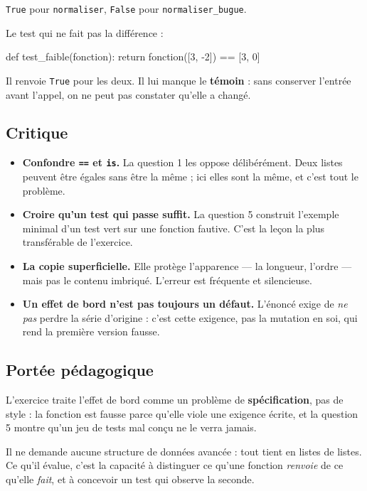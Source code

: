 \lstinline{True} pour \lstinline{normaliser}, \lstinline{False} pour
\lstinline{normaliser_bugue}.

Le test qui ne fait pas la différence :

\begin{python}
def test_faible(fonction):
    return fonction([3, -2]) == [3, 0]
\end{python}

Il renvoie \lstinline{True} pour les deux. Il lui manque le \textbf{témoin} :
sans conserver l'entrée avant l'appel, on ne peut pas constater qu'elle a
changé.

\subsection*{Critique}

\begin{itemize}
  \item \textbf{Confondre \lstinline{==} et \lstinline{is}.} La question 1 les
    oppose délibérément. Deux listes peuvent être égales sans être la même ; ici
    elles sont la même, et c'est tout le problème.
  \item \textbf{Croire qu'un test qui passe suffit.} La question 5 construit
    l'exemple minimal d'un test vert sur une fonction fautive. C'est la leçon la
    plus transférable de l'exercice.
  \item \textbf{La copie superficielle.} Elle protège l'apparence — la longueur,
    l'ordre — mais pas le contenu imbriqué. L'erreur est fréquente et
    silencieuse.
  \item \textbf{Un effet de bord n'est pas toujours un défaut.} L'énoncé exige
    de \emph{ne pas} perdre la série d'origine : c'est cette exigence, pas la
    mutation en soi, qui rend la première version fausse.
\end{itemize}

\subsection*{Portée pédagogique}

L'exercice traite l'effet de bord comme un problème de \textbf{spécification},
pas de style : la fonction est fausse parce qu'elle viole une exigence écrite,
et la question 5 montre qu'un jeu de tests mal conçu ne le verra jamais.

Il ne demande aucune structure de données avancée : tout tient en listes de
listes. Ce qu'il évalue, c'est la capacité à distinguer ce qu'une fonction
\emph{renvoie} de ce qu'elle \emph{fait}, et à concevoir un test qui observe la
seconde.
